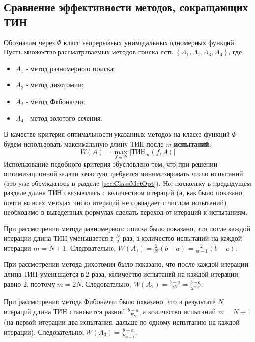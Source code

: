 \documentclass[a4paper,12pt]{report}
\begin{document}
\subsection{Сравнение эффективности методов, сокращающих ТИН}
\label{sec:EffectOneVarMethods}
Обозначим через $\Phi$ класс непрерывных унимодальных одномерных функций. Пусть множество рассматриваемых методов поиска есть $\left\{A_{1}, A_{2}, A_{3}, A_{4}\right\}$, где
\begin{itemize}
\item $A_{1}$ - метод равномерного поиска;
\item $A_{2}$ - метод дихотомии;
\item $A_{3}$ - метод Фибоначчи;
\item $A_{4}$ - метод золотого сечения.
\end{itemize}
В качестве критерия оптимальности указанных методов на классе функций $\Phi$ будем использовать максимальную длину ТИН после $m$ \textbf{испытаний}:
\begin{equation}
\label{eq:num10}
W(A) = \underset{f \in \Phi}{\max} \left|\text{ТИН}_{m}(f, A)\right|
\end{equation}
Использование подобного критерия обусловлено тем, что при решении оптимизационной задачи зачастую требуется минимизировать число испытаний (это уже обсуждалось в разделе \ref{sec:ClassMetOpt}). Но, поскольку в предыдущем разделе длина ТИН связывалась с количеством итераций (а, как было показано, почти во всех методах число итераций не совпадает с числом испытаний), необходимо в выведенных формулах сделать переход от итераций к испытаниям.

При рассмотрении метода равномерного поиска было показано, что после каждой итерации длина ТИН уменьшается в $\frac{N}{2}$ раз, а количество испытаний на каждой итерации $m = N + 1$. Следовательно, $W(A_{1}) = \frac{2}{N}\left(b-a\right) = \frac{2}{m-1}\left(b-a\right)$.

При рассмотрении метода дихотомии было показано, что после каждой итерации длина ТИН уменьшается в 2 раза, количество испытаний на каждой итерации равно 2, поэтому $m = 2N$. Следовательно, $W(A_{2}) = \frac{b-a}{2^{N}} = \frac{b-a}{2^{m/2}}$.

При рассмотрении метода Фибоначчи было показано, что в результате $N$ итераций длина ТИН становится равной $\frac{b-a}{F_{N}}$, а количество испытаний $m = N + 1$ (на первой итерации два испытания, дальше по одному испытанию на каждой итерации). Следовательно, $W(A_{3}) = \frac{b-a}{F_{m - 1}}$.
\end{document}
